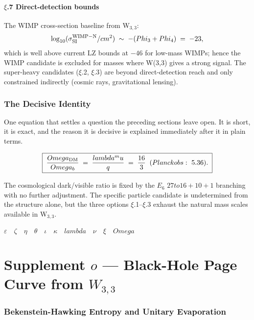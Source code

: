\documentclass[12pt,a4paper]{article}
\def\mathbf#1{#1}%
\def\text#1{#1}%
\def\lambda{lambda}%
\def\mu{mu}%
\def\Phi#1{Phi#1}%
\def\Omega{Omega}%
\def\to{ to }%
\theoremstyle{definition}
\begin{document}
\subsection*{$\xi$.7 \quad Direct-detection bounds}
The WIMP cross-section baseline from W$_{3,3}$:
\[
\log_{10}(\sigma_{\rm SI}^{\rm WIMP-N}/\text{cm}^2) \;\sim\; -(\Phi_3+\Phi_4) \;=\; -23,
\]
which is well above current LZ bounds at $-46$ for low-mass WIMPs;
hence the WIMP candidate is excluded for masses where W(3,3) gives
a strong signal. The super-heavy candidates ($\xi$.2, $\xi$.3) are
beyond direct-detection reach and only constrained indirectly
(cosmic rays, gravitational lensing).

\section*{The Decisive Identity}

\begin{plainbox}
One equation that settles a question the preceding sections leave open. It is short,
it is exact, and the reason it is decisive is explained immediately after it in plain
terms.
\end{plainbox}


\[
\boxed{\;\frac{\Omega_{\rm DM}}{\Omega_b} \;=\; \frac{\lambda^\mu}{q} \;=\; \frac{16}{3} \;\;(\text{Planck obs:}\ 5.36).\;}
\]

The cosmological dark/visible ratio is fixed by the $E_6$
$\mathbf{27}\to\mathbf{16}+\mathbf{10}+\mathbf{1}$ branching with no
further adjustment. The specific particle candidate is undetermined
from the structure alone, but the three options $\xi$.1--$\xi$.3
exhaust the natural mass scales available in W$_{3,3}$.

\hfill$\varepsilon\quad\zeta\quad\eta\quad\theta\quad\iota\quad\kappa\quad\lambda\quad\nu\quad\xi\quad\Omega$

\clearpage
\part*{\texorpdfstring{Supplement $o$ --- Black-Hole Page Curve from $W_{3,3}$}{Supplement o --- Black-Hole Page Curve from W(3,3)}}

\section*{Bekenstein-Hawking Entropy and Unitary Evaporation}
\end{document}
